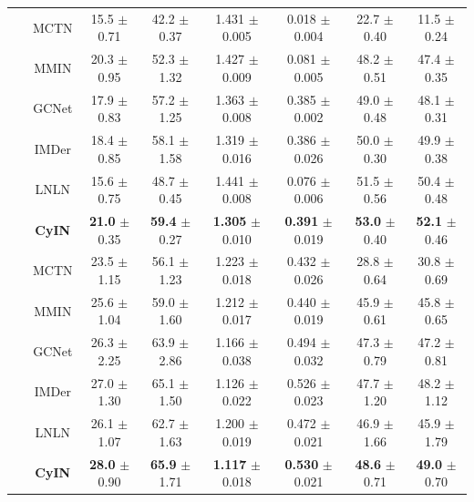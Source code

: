 \documentclass{article}
\begin{document}
\begin{table}[htbp]
{\begin{tabular}{cccccccc}
    \midrule[0.5pt]
        ~ & MCTN & 15.5 $\pm$ 0.71  & 42.2 $\pm$ 0.37  & 1.431 $\pm$ 0.005  & 0.018 $\pm$  0.004   & 22.7 $\pm$  0.40 & 11.5 $\pm$ 0.24   \\ 
        ~ & MMIN & 20.3 $\pm$  0.95 & 52.3 $\pm$  1.32 & 1.427 $\pm$ 0.009  & 0.081 $\pm$ 0.005  & 48.2 $\pm$ 0.51  & 47.4 $\pm$ 0.35  \\ 
        ~ & GCNet & 17.9 $\pm$ 0.83  & 57.2 $\pm$ 1.25  & 1.363 $\pm$ 0.008  & 0.385 $\pm$  0.002 & 49.0 $\pm$ 0.48 & 48.1 $\pm$  0.31   \\ 
        ~ & IMDer & 18.4 $\pm$ 0.85  & 58.1 $\pm$ 1.58  & 1.319 $\pm$  0.016 & 0.386  $\pm$ 0.026   & 50.0 $\pm$  0.30 & 49.9 $\pm$ 0.38  \\ 
         ~ & LNLN & 15.6 $\pm$ 0.75  & 48.7 $\pm$ 0.45  & 1.441 $\pm$ 0.008  & 0.076 $\pm$ 0.006  & 51.5 $\pm$ 0.56  & 50.4 $\pm$ 0.48  \\ 
    & \textbf{CyIN}  & \textbf{21.0} $\pm$ 0.35 & \textbf{59.4} $\pm$ 0.27 & \textbf{1.305} $\pm$ 0.010 & \textbf{0.391} $\pm$ 0.019 & \textbf{53.0} $\pm$ 0.40 & \textbf{52.1} $\pm$ 0.46 \\

    \midrule[0.5pt]
        ~ & MCTN & 23.5 $\pm$ 1.15  & 56.1 $\pm$  1.23 & 1.223 $\pm$ 0.018  & 0.432  $\pm$ 0.026  & 28.8 $\pm$ 0.64  & 30.8 $\pm$ 0.69   \\ 
        ~ & MMIN & 25.6 $\pm$ 1.04  & 59.0 $\pm$ 1.60  & 1.212 $\pm$ 0.017  & 0.440 $\pm$ 0.019  & 45.9 $\pm$ 0.61  & 45.8 $\pm$  0.65 \\ 
        ~ & GCNet & 26.3 $\pm$ 2.25 & 63.9 $\pm$ 2.86 & 1.166 $\pm$ 0.038  & 0.494  $\pm$ 0.032  & 47.3 $\pm$ 0.79  & 47.2  $\pm$ 0.81  \\ 
        ~ & IMDer & 27.0 $\pm$ 1.30  & 65.1 $\pm$ 1.50  & 1.126 $\pm$  0.022 & 0.526 $\pm$  0.023   & 47.7 $\pm$  1.20 & 48.2 $\pm$ 1.12   \\ 
        ~ & LNLN & 26.1 $\pm$ 1.07  & 62.7 $\pm$ 1.63  & 1.200 $\pm$ 0.019  & 0.472 $\pm$  0.021 & 46.9 $\pm$  1.66 & 45.9 $\pm$ 1.79   \\ 
    & \textbf{CyIN} & \textbf{28.0} $\pm$ 0.90 & \textbf{65.9} $\pm$ 1.71 & \textbf{1.117} $\pm$ 0.018 & \textbf{0.530} $\pm$ 0.021 & \textbf{48.6} $\pm$ 0.71 & \textbf{49.0} $\pm$ 0.70 \\ 
    
    \bottomrule[1.5pt]
    
\end{tabular}
}
\end{table}
\end{document}
